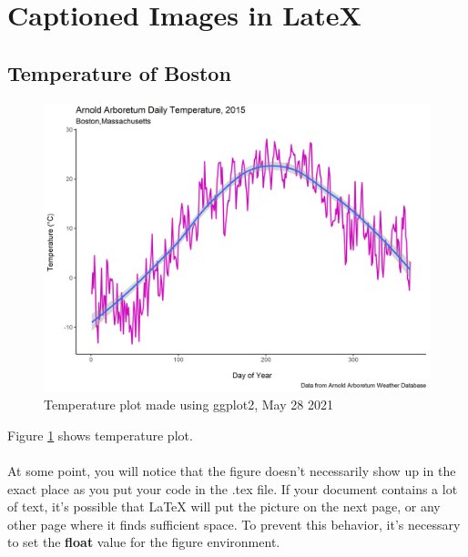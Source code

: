 \documentclass[a4paper, 12pt]{article}
\begin{document}
\section{Captioned Images in LateX}
\subsection{Temperature of Boston}
\begin{figure}[H]  %
  \includegraphics[width=\linewidth]{Figures/Temp_complete_2015.png}
  \caption{Temperature plot made using ggplot2, May 28 2021}
  \label{fig:Temp_complete_20151}
\end{figure}
Figure \ref{fig:Temp_complete_20151} shows temperature plot.

\paragraph{} At some point, you will notice that the figure doesn’t necessarily show up in the exact place as you put your code in the .tex file. If your document contains a lot of text, it’s possible that LaTeX will put the picture on the next page, or any other page where it finds sufficient space. To prevent this behavior, it’s necessary to set the \textbf{float} value for the figure environment.
\end{document}

